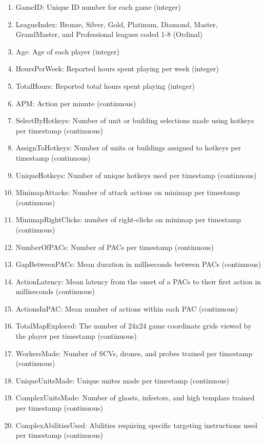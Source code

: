 \documentclass[]{article}
\providecommand{\tightlist}{%
  \setlength{\itemsep}{0pt}\setlength{\parskip}{0pt}}
\begin{document}
\begin{enumerate}
\def\labelenumi{\arabic{enumi}.}
\tightlist
\item
  GameID: Unique ID number for each game (integer)
\item
  LeagueIndex: Bronze, Silver, Gold, Platinum, Diamond, Master,
  GrandMaster, and Professional leagues coded 1-8 (Ordinal)
\item
  Age: Age of each player (integer)
\item
  HoursPerWeek: Reported hours spent playing per week (integer)
\item
  TotalHours: Reported total hours spent playing (integer)
\item
  APM: Action per minute (continuous)
\item
  SelectByHotkeys: Number of unit or building selections made using
  hotkeys per timestamp (continuous)
\item
  AssignToHotkeys: Number of units or buildings assigned to hotkeys per
  timestamp (continuous)
\item
  UniqueHotkeys: Number of unique hotkeys used per timestamp
  (continuous)
\item
  MinimapAttacks: Number of attack actions on minimap per timestamp
  (continuous)
\item
  MinimapRightClicks: number of right-clicks on minimap per timestamp
  (continuous)
\item
  NumberOfPACs: Number of PACs per timestamp (continuous)
\item
  GapBetweenPACs: Mean duration in milliseconds between PACs
  (continuous)
\item
  ActionLatency: Mean latency from the onset of a PACs to their first
  action in milliseconds (continuous)
\item
  ActionsInPAC: Mean number of actions within each PAC (continuous)
\item
  TotalMapExplored: The number of 24x24 game coordinate grids viewed by
  the player per timestamp (continuous)
\item
  WorkersMade: Number of SCVs, drones, and probes trained per timestamp
  (continuous)
\item
  UniqueUnitsMade: Unique unites made per timestamp (continuous)
\item
  ComplexUnitsMade: Number of ghosts, infestors, and high templars
  trained per timestamp (continuous)
\item
  ComplexAbilitiesUsed: Abilities requiring specific targeting
  instructions used per timestamp (continuous)
\end{enumerate}
\end{document}
